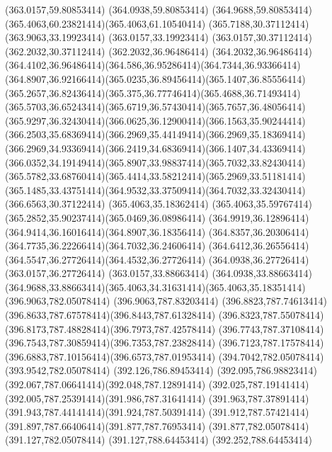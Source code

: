 {{	\lineto(363.0157,59.80853414)
	\lineto(364.0938,59.80853414)
	\curveto(364.9688,59.80853414)(365.4063,60.23821414)(365.4063,61.10540414)
	\closepath
	\moveto(365.7188,30.37112414)
	\lineto(363.9063,33.19923414)
	\lineto(363.0157,33.19923414)
	\lineto(363.0157,30.37112414)
	\lineto(362.2032,30.37112414)
	\lineto(362.2032,36.96486414)
	\lineto(364.2032,36.96486414)
	\curveto(364.4102,36.96486414)(364.586,36.95286414)(364.7344,36.93366414)
	\curveto(364.8907,36.92166414)(365.0235,36.89456414)(365.1407,36.85556414)
	\curveto(365.2657,36.82436414)(365.375,36.77746414)(365.4688,36.71493414)
	\curveto(365.5703,36.65243414)(365.6719,36.57430414)(365.7657,36.48056414)
	\curveto(365.9297,36.32430414)(366.0625,36.12900414)(366.1563,35.90244414)
	\curveto(366.2503,35.68369414)(366.2969,35.44149414)(366.2969,35.18369414)
	\curveto(366.2969,34.93369414)(366.2419,34.68369414)(366.1407,34.43369414)
	\curveto(366.0352,34.19149414)(365.8907,33.98837414)(365.7032,33.82430414)
	\curveto(365.5782,33.68760414)(365.4414,33.58212414)(365.2969,33.51181414)
	\curveto(365.1485,33.43751414)(364.9532,33.37509414)(364.7032,33.32430414)
	\lineto(366.6563,30.37122414)
	\closepath
	\moveto(365.4063,35.18362414)
	\curveto(365.4063,35.59767414)(365.2852,35.90237414)(365.0469,36.08986414)
	\curveto(364.9919,36.12896414)(364.9414,36.16016414)(364.8907,36.18356414)
	\curveto(364.8357,36.20306414)(364.7735,36.22266414)(364.7032,36.24606414)
	\curveto(364.6412,36.26556414)(364.5547,36.27726414)(364.4532,36.27726414)
	\lineto(364.0938,36.27726414)
	\lineto(363.0157,36.27726414)
	\lineto(363.0157,33.88663414)
	\lineto(364.0938,33.88663414)
	\curveto(364.9688,33.88663414)(365.4063,34.31631414)(365.4063,35.18351414)
	\closepath
	\moveto(396.9063,782.05078414)
	\lineto(396.9063,787.83203414)
	\curveto(396.8823,787.74613414)(396.8633,787.67578414)(396.8443,787.61328414)
	\curveto(396.8323,787.55078414)(396.8173,787.48828414)(396.7973,787.42578414)
	\curveto(396.7743,787.37108414)(396.7543,787.30859414)(396.7353,787.23828414)
	\curveto(396.7123,787.17578414)(396.6883,787.10156414)(396.6573,787.01953414)
	\lineto(394.7042,782.05078414)
	\lineto(393.9542,782.05078414)
	\lineto(392.126,786.89453414)
	\curveto(392.095,786.98823414)(392.067,787.06641414)(392.048,787.12891414)
	\curveto(392.025,787.19141414)(392.005,787.25391414)(391.986,787.31641414)
	\curveto(391.963,787.37891414)(391.943,787.44141414)(391.924,787.50391414)
	\curveto(391.912,787.57421414)(391.897,787.66406414)(391.877,787.76953414)
	\lineto(391.877,782.05078414)
	\lineto(391.127,782.05078414)
	\lineto(391.127,788.64453414)
	\lineto(392.252,788.64453414)
}}

